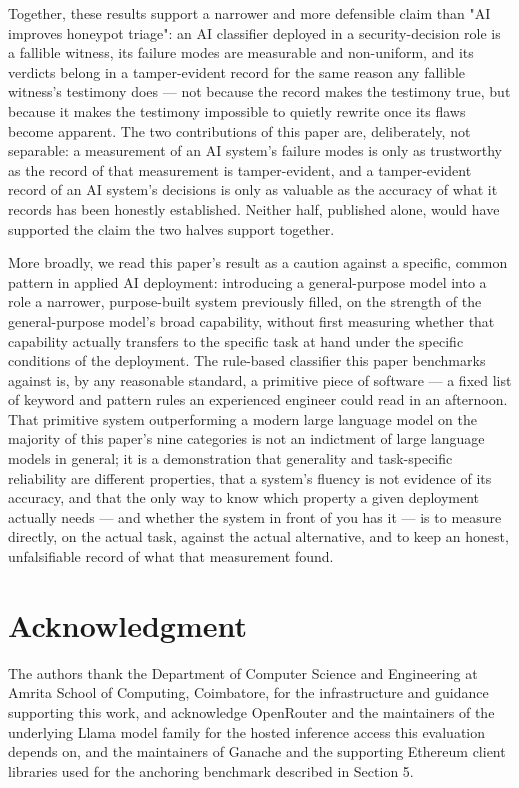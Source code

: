 \documentclass[journal,10pt,twocolumn]{IEEEtran}
\begin{document}
Together, these results support a narrower and more defensible claim than "AI improves honeypot triage": an AI classifier deployed in a security-decision role is a fallible witness, its failure modes are measurable and non-uniform, and its verdicts belong in a tamper-evident record for the same reason any fallible witness's testimony does --- not because the record makes the testimony true, but because it makes the testimony impossible to quietly rewrite once its flaws become apparent. The two contributions of this paper are, deliberately, not separable: a measurement of an AI system's failure modes is only as trustworthy as the record of that measurement is tamper-evident, and a tamper-evident record of an AI system's decisions is only as valuable as the accuracy of what it records has been honestly established. Neither half, published alone, would have supported the claim the two halves support together.

More broadly, we read this paper's result as a caution against a specific, common pattern in applied AI deployment: introducing a general-purpose model into a role a narrower, purpose-built system previously filled, on the strength of the general-purpose model's broad capability, without first measuring whether that capability actually transfers to the specific task at hand under the specific conditions of the deployment. The rule-based classifier this paper benchmarks against is, by any reasonable standard, a primitive piece of software --- a fixed list of keyword and pattern rules an experienced engineer could read in an afternoon. That primitive system outperforming a modern large language model on the majority of this paper's nine categories is not an indictment of large language models in general; it is a demonstration that generality and task-specific reliability are different properties, that a system's fluency is not evidence of its accuracy, and that the only way to know which property a given deployment actually needs --- and whether the system in front of you has it --- is to measure directly, on the actual task, against the actual alternative, and to keep an honest, unfalsifiable record of what that measurement found.

\section{Acknowledgment}

The authors thank the Department of Computer Science and Engineering at Amrita School of Computing, Coimbatore, for the infrastructure and guidance supporting this work, and acknowledge OpenRouter and the maintainers of the underlying Llama model family for the hosted inference access this evaluation depends on, and the maintainers of Ganache and the supporting Ethereum client libraries used for the anchoring benchmark described in Section 5.
\end{document}
